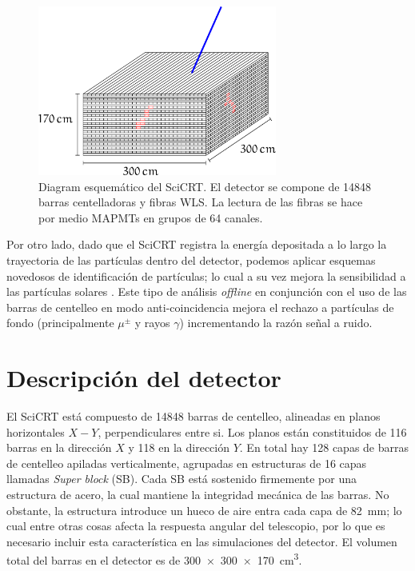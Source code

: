 \begin{figure}
        \centering
        \includegraphics[width=0.7\textwidth]{scibar-diagram.pdf}
        \caption{Diagram esquemático del SciCRT. El detector se compone de \num{14848} barras centelladoras y fibras WLS. La lectura de las fibras se hace por medio MAPMTs en grupos de \num{64} canales.}
        \label{fig:scibar-detector}
\end{figure}

Por otro lado, dado que el SciCRT registra la energía depositada a lo largo la trayectoria de las partículas dentro del detector, podemos aplicar esquemas novedosos de identificación de partículas; lo cual a su vez mejora la sensibilidad a las partículas solares \cite{garcia20}. Este tipo de análisis \emph{offline} en conjunción con el uso de las barras de centelleo en modo anti-coincidencia mejora el rechazo a partículas de fondo (principalmente $\mu^{\pm}$ y rayos $\gamma$) incrementando la razón señal a ruido.

\section{Descripción del detector}

El SciCRT está compuesto de \num{14848} barras de centelleo, alineadas en planos horizontales $X-Y$, perpendiculares entre si. Los planos están constituidos de \num{116} barras en la dirección $X$ y \num{118} en la dirección $Y$. En total hay \num{128} capas de barras de centelleo apiladas verticalmente, agrupadas en estructuras de \num{16} capas llamadas \emph{Super block} (SB). Cada SB está sostenido firmemente por una estructura de acero, la cual mantiene la integridad mecánica de las barras. No obstante, la estructura introduce un hueco de aire entra cada capa de \SI{82}{\mm}; lo cual entre otras cosas afecta la respuesta angular del telescopio, por lo que es necesario incluir esta característica en las simulaciones del detector. El volumen total del barras en el detector es de \SI[product-units=power]{300x300x170}{\cubic\cm}.

